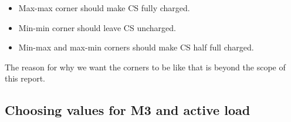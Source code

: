 \begin{itemize}
    \item Max-max corner should make CS fully charged.
    \item Min-min corner should leave CS uncharged.
    \item Min-max and max-min corners should make CS half full charged.
\end{itemize}

The reason for why we want the corners to be like that is beyond the scope of this report.

\subsection{Choosing values for M3 and active load}
